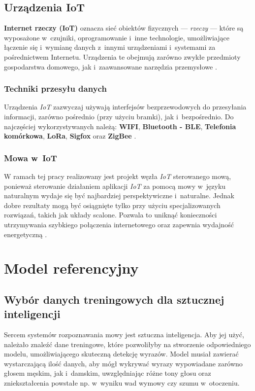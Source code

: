 \subsection{Urządzenia IoT}

\textbf{Internet rzeczy (IoT)} oznacza sieć obiektów fizycznych — \textit{rzeczy} — które są wyposażone w~czujniki, oprogramowanie i~inne technologie, umożliwiające łączenie się i~wymianę danych z~innymi urządzeniami i~systemami za pośrednictwem Internetu. Urządzenia te obejmują zarówno zwykłe przedmioty gospodarstwa domowego, jak i~zaawansowane narzędzia przemysłowe \cite{Oracle:IoT}.

\subsubsection{Techniki przesyłu danych}

Urządzenia \textit{IoT} zazwyczaj używają interfejsów bezprzewodowych do przesyłania informacji, zarówno pośrednio (przy użyciu bramki), jak i~bezpośrednio. Do najczęściej wykorzystywanych należą: \textbf{WIFI}, \textbf{Bluetooth - BLE}, \textbf{Telefonia komórkowa}, \textbf{LoRa}, \textbf{Sigfox} oraz \textbf{ZigBee} \cite{KomunikacjaIx}.

\subsubsection{Mowa w~IoT}

W ramach tej pracy realizowany jest projekt węzła \textit{IoT} sterowanego mową, ponieważ sterowanie działaniem aplikacji \textit{IoT} za pomocą mowy w~języku naturalnym wydaje się być najbardziej perspektywiczne i~naturalne. Jednak dobre rezultaty mogą być osiągnięte tylko przy użyciu specjalizowanych rozwiązań, takich jak układy scalone. Pozwala to uniknąć konieczności utrzymywania szybkiego połączenia internetowego oraz zapewnia wydajność energetyczną \cite{SpeechI}.

\newpage
\section{Model referencyjny}

\subsection{Wybór danych treningowych dla sztucznej inteligencji}

Sercem systemów rozpoznawania mowy jest sztuczna inteligencja. Aby jej użyć, należało znaleźć dane treningowe, które pozwoliłyby na stworzenie odpowiedniego modelu, umożliwiającego skuteczną detekcję wyrazów. Model musiał zawierać wystarczającą ilość danych, aby mógł wykrywać wyrazy wypowiadane zarówno głosem męskim, jak i~damskim, uwzględniając różne tony głosu oraz zniekształcenia powstałe np. w~wyniku wad wymowy czy szumu w~otoczeniu.

